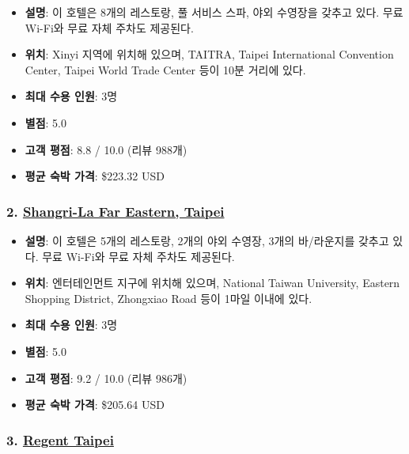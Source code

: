 \documentclass[
  letterpaper,
]{book}
\providecommand{\tightlist}{%
  \setlength{\itemsep}{0pt}\setlength{\parskip}{0pt}}\usepackage{longtable,booktabs,array}
\begin{document}
\begin{tcolorbox}
\begin{itemize}
\tightlist
\item
  \textbf{설명}: 이 호텔은 8개의 레스토랑, 풀 서비스 스파, 야외 수영장을
  갖추고 있다. 무료 Wi-Fi와 무료 자체 주차도 제공된다.
\item
  \textbf{위치}: Xinyi 지역에 위치해 있으며, TAITRA, Taipei
  International Convention Center, Taipei World Trade Center 등이 10분
  거리에 있다.
\item
  \textbf{최대 수용 인원}: 3명
\item
  \textbf{별점}: 5.0
\item
  \textbf{고객 평점}: 8.8 / 10.0 (리뷰 988개)
\item
  \textbf{평균 숙박 가격}: \$223.32 USD
\end{itemize}

\hypertarget{shangri-la-far-eastern-taipei}{%
\subsubsection*{\texorpdfstring{2.
\href{https://apim.expedia.com/recommendations/og-redirect/75c5e3e4-c525-4cbb-8d48-d54329937a86?brand=bex}{Shangri-La
Far Eastern,
Taipei}}{2. Shangri-La Far Eastern, Taipei}}\label{shangri-la-far-eastern-taipei}}

\begin{itemize}
\tightlist
\item
  \textbf{설명}: 이 호텔은 5개의 레스토랑, 2개의 야외 수영장, 3개의
  바/라운지를 갖추고 있다. 무료 Wi-Fi와 무료 자체 주차도 제공된다.
\item
  \textbf{위치}: 엔터테인먼트 지구에 위치해 있으며, National Taiwan
  University, Eastern Shopping District, Zhongxiao Road 등이 1마일
  이내에 있다.
\item
  \textbf{최대 수용 인원}: 3명
\item
  \textbf{별점}: 5.0
\item
  \textbf{고객 평점}: 9.2 / 10.0 (리뷰 986개)
\item
  \textbf{평균 숙박 가격}: \$205.64 USD
\end{itemize}

\hypertarget{regent-taipei}{%
\subsubsection*{\texorpdfstring{3.
\href{https://apim.expedia.com/recommendations/og-redirect/e4ca1e2c-c25d-4960-b2cd-dcaddb977b79?brand=bex}{Regent
Taipei}}{3. Regent Taipei}}\label{regent-taipei}}


\end{tcolorbox}
\end{document}
